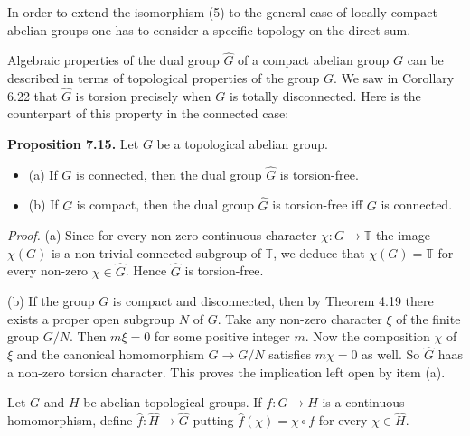 \documentclass[12pt]{article}
\begin{document}
    In order to extend the isomorphism (5) to the general case of locally compact abelian groups one has to
consider a specific topology on the direct sum.


    Algebraic properties of the dual group $\hat{G}$ of a compact abelian group $G$ can be described in terms of
topological properties of the group $G$. We saw in Corollary 6.22 that $\hat{G}$ is torsion precisely when $G$ is totally
disconnected. Here is the counterpart of this property in the connected case:


\textbf{Proposition 7.15.} Let $G$ be a topological abelian group.


\begin{itemize}

    \item (a) If $G$ is connected, then the dual group $\hat{G}$ is torsion-free.

    \item (b) If $G$ is compact, then the dual group $\hat{G}$ is torsion-free iff $G$ is connected.

\end{itemize}


\emph{Proof.} (a) Since for every non-zero continuous character $\chi : G \to \mathbb{T}$ the image $\chi(G)$ is a non-trivial connected
subgroup of $\mathbb{T}$, we deduce that $\chi(G) = \mathbb{T}$ for every non-zero $\chi \in \hat{G}$. Hence $\hat{G}$ is torsion-free.


    (b) If the group $G$ is compact and disconnected, then by Theorem 4.19 there exists a proper open subgroup
$N$ of $G$. Take any non-zero character $\xi$ of the finite group $G/N$. Then $m \xi = 0$ for some positive integer $m$.
Now the composition $\chi$ of $\xi$ and the canonical homomorphism $G \to G/N$ satisfies $m\chi = 0$ as well. So $\hat{G}$ haas a
non-zero torsion character. This proves the implication left open by item (a).


    Let $G$ and $H$ be abelian topological groups. If $f : G \to H$ is a continuous homomorphism, define $\hat{f}: \hat{H} \to \hat{G}$
putting $\hat{f}(\chi) = \chi \circ f$ for every $\chi \in \hat{H}$.

\maketitle
\end{document}
